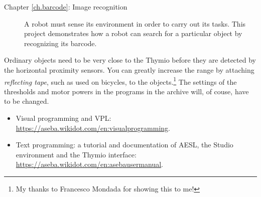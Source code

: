 \begin{description}
\item[Chapter \ref{ch.barcode}: Image recognition] A robot must sense
its environment in order to carry out its tasks. This project
demonstrates how a robot can search for a particular object by
recognizing its barcode.

\end{description}

\newpage


Ordinary objects need to be very close to the Thymio before they are
detected by the horizontal proximity sensors. You can greatly increase
the range by attaching \emph{reflecting tape}, such as used on bicycles,
to the objects.\footnote{My thanks to Francesco Mondada for showing this
to me!} The settings of the thresholds and motor powers in the programs
in the archive will, of couse, have to be changed.\label{p.reflect}


\begin{itemize}
\item Visual programming and VPL:\\ 
\url{https://aseba.wikidot.com/en:visualprogramming}.

\item Text programming: a tutorial and documentation
of AESL, the Studio environment and the Thymio interface:\\
\url{https://aseba.wikidot.com/en:asebausermanual}.
\end{itemize}
